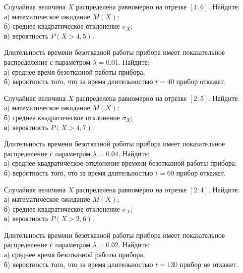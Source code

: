\vfill

\newpage\setcounter{zad}{0}

\z Случайная величина $X$ распределена равномерно на отрезке $[1; 6]$. Найдите: \\ \quad а) математическое ожидание $M(X)$; \\ \quad б) среднее квадратическое отклонение $\sigma_X$; \\ \quad в) вероятность $P(X>4{,}5)$.


\vfill

\z Длительность времени безотказной работы прибора имеет показательное распределение с параметром $\lambda = 0.01$. Найдите: \\ \quad а) среднее время безотказной работы прибора; \\ \quad б) вероятность того, что за время длительностью $t = 40$ прибор откажет.
 

\vfill

\newpage\setcounter{zad}{0}

\z Случайная величина $X$ распределена равномерно на отрезке $[2; 5]$. Найдите: \\ \quad а) математическое ожидание $M(X)$; \\ \quad б) среднее квадратическое отклонение $\sigma_X$; \\ \quad в) вероятность $P(X>4{,}7)$.


\vfill

\z Длительность времени безотказной работы прибора имеет показательное распределение с параметром $\lambda = 0.04$. Найдите: \\ \quad а) среднее квадратическое отклонение времени безотказной работы прибора; \\ \quad б) вероятность того, что за время длительностью $t = 60$ прибор откажет.
 

\vfill

\newpage\setcounter{zad}{0}

\z Случайная величина $X$ распределена равномерно на отрезке $[2; 4]$. Найдите: \\ \quad а) математическое ожидание $M(X)$; \\ \quad б) среднее квадратическое отклонение $\sigma_X$; \\ \quad в) вероятность $P(X>2{,}6)$.


\vfill

\z Длительность времени безотказной работы прибора имеет показательное распределение с параметром $\lambda = 0.02$. Найдите: \\ \quad а) среднее время безотказной работы прибора; \\ \quad б) вероятность того, что за время длительностью $t = 130$ прибор не откажет.
 

